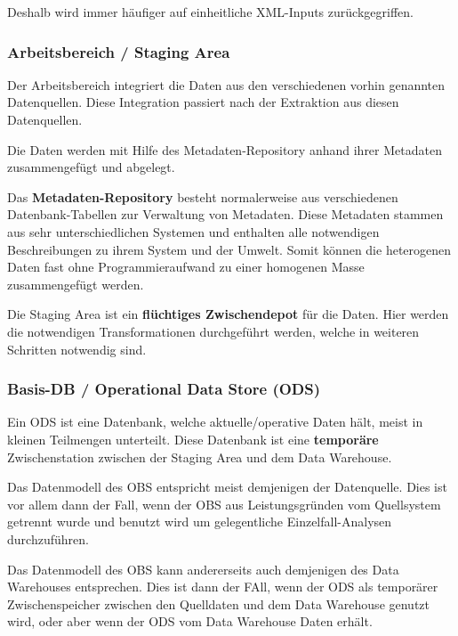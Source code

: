 \documentclass[a4paper, 11pt]{article}
\begin{document}
Deshalb wird immer häufiger auf einheitliche XML-Inputs zurückgegriffen.

\subsubsection{Arbeitsbereich / Staging Area}
Der Arbeitsbereich integriert die Daten aus den verschiedenen vorhin genannten Datenquellen. Diese Integration passiert nach der Extraktion aus diesen Datenquellen.

Die Daten werden mit Hilfe des Metadaten-Repository anhand ihrer Metadaten zusammengefügt und abgelegt.

Das \textbf{Metadaten-Repository} besteht normalerweise aus verschiedenen Datenbank-Tabellen zur Verwaltung von Metadaten. Diese Metadaten stammen aus sehr unterschiedlichen Systemen und enthalten alle notwendigen Beschreibungen zu ihrem System und der Umwelt. Somit können die heterogenen Daten fast ohne Programmieraufwand zu einer homogenen Masse zusammengefügt werden.

\vspace{10px}

\noindent Die Staging Area ist ein \textbf{flüchtiges Zwischendepot} für die Daten. Hier werden die notwendigen Transformationen durchgeführt werden, welche in weiteren Schritten notwendig sind.

\subsubsection{Basis-DB / Operational Data Store (ODS)}
Ein ODS ist eine Datenbank, welche aktuelle/operative Daten hält, meist in kleinen Teilmengen unterteilt. Diese Datenbank ist eine \textbf{temporäre} Zwischenstation zwischen der Staging Area und dem Data Warehouse. 

\vspace{10px}

\noindent Das Datenmodell des OBS entspricht meist demjenigen der Datenquelle. Dies ist vor allem dann der Fall, wenn der OBS aus Leistungsgründen vom Quellsystem getrennt wurde und benutzt wird um gelegentliche Einzelfall-Analysen durchzuführen.

\vspace{10px}

\noindent Das Datenmodell des OBS kann andererseits auch demjenigen des Data Warehouses entsprechen. Dies ist dann der FAll, wenn der ODS als temporärer Zwischenspeicher zwischen den Quelldaten und dem Data Warehouse genutzt wird, oder aber wenn der ODS vom Data Warehouse Daten erhält.
\end{document}
